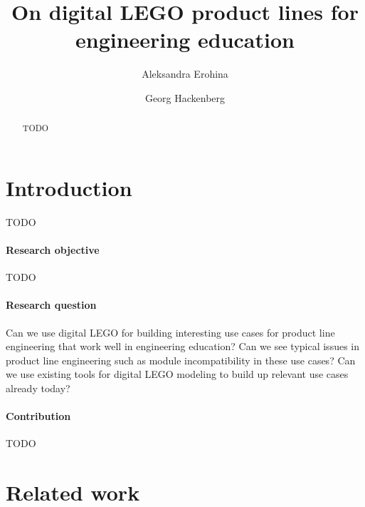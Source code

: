\documentclass[sigconf,review]{acmart}
\begin{document}
\title{On digital LEGO product lines for engineering education}

\author{Aleksandra Erohina}

\author{Georg Hackenberg}

\begin{abstract}
    TODO
\end{abstract}


\maketitle

\section{Introduction}
\label{sec:introduction}

TODO~\cite{Hackenberg_2023}

\paragraph{Research objective}

TODO

\paragraph{Research question}

Can we use digital LEGO for building interesting use cases for product line engineering that work well in engineering education?
Can we see typical issues in product line engineering such as module incompatibility in these use cases?
Can we use existing tools for digital LEGO modeling to build up relevant use cases already today?

\paragraph{Contribution}

TODO

\section{Related work}
\label{sec:related-work}
\end{document}

